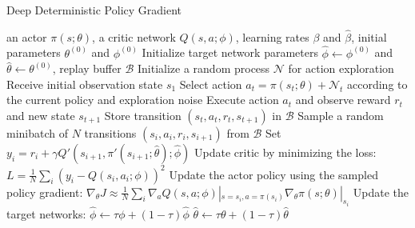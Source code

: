 \begin{algorithm}[htb!]
\caption{Deep Deterministic Policy Gradient}
\label{Code:DeepDeterministicPolicyGradient}
\begin{algorithmic}
\REQUIRE an actor $\pi(s; \theta)$, a critic network $Q(s, a; \phi)$, learning rates $\beta$ and $\hat{\beta}$, initial parameters $\theta^{(0)}$ and $\phi^{(0)}$
\STATE Initialize target network parameters $\hat{\phi} \leftarrow \phi^{(0)}$ and $\hat{\theta} \leftarrow \theta^{(0)}$, replay buffer $\mathcal{B}$
    \STATE Initialize a random process $\mathcal{N}$ for action exploration
    \STATE Receive initial observation state $s_1$
        \STATE Select action $a_t = \pi(s_t; \theta) + \mathcal{N}_t$ according to the current policy and exploration noise
        \STATE Execute action $a_t$ and observe reward $r_t$ and new state $s_{t+1}$
        \STATE Store transition $(s_t, a_t, r_t, s_{t+1})$ in $\mathcal{B}$
        \STATE Sample a random minibatch of $N$ transitions $(s_i, a_i, r_i, s_{i+1})$ from $\mathcal{B}$
        \STATE Set $y_i = r_i + \gamma Q'(s_{i+1}, \pi'(s_{i+1}; \hat{\theta}); \hat{\phi})$
        \STATE Update critic by minimizing the loss: $L = \frac{1}{N}\sum_i(y_i - Q(s_i, a_i; \phi))^2$
        \STATE Update the actor policy using the sampled policy gradient:
        \STATE $\nabla_{\theta} J \approx \frac{1}{N}\sum_i \nabla_a Q(s, a; \phi)|_{s=s_i, a=\pi(s_i)} \nabla_{\theta}\pi(s; \theta)|_{s_i}$
        \STATE Update the target networks:
        \STATE $\hat{\phi} \leftarrow \tau \phi + (1 - \tau) \hat{\phi}$
        \STATE $\hat{\theta} \leftarrow \tau \theta + (1 - \tau) \hat{\theta}$
    \ENDFOR
\ENDFOR
\end{algorithmic}
\end{algorithm}
